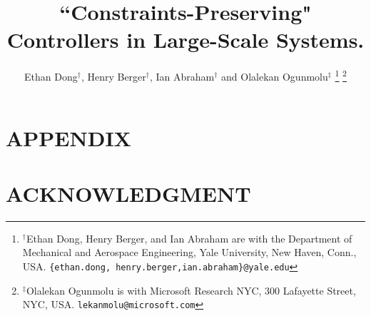 \documentclass[letterpaper, 10 pt, conference]{ieeeconf}  %
\title{\LARGE \bf
``Constraints-Preserving" Controllers in Large-Scale Systems.}
\author{Ethan Dong$^{\dagger}$, Henry Berger$^{\dagger}$,  Ian Abraham$^{\dagger}$ and Olalekan Ogunmolu$^{\ddagger}$
\thanks{$^{\dagger}$Ethan Dong, Henry Berger, and Ian Abraham are with the Department of Mechanical and Aerospace Engineering, Yale University, New Haven, Conn., USA.
{\tt\small \{ethan.dong, henry.berger,ian.abraham\}@yale.edu}}%
\thanks{$^{\ddagger}$Olalekan Ogunmolu  is with Microsoft Research NYC, 300 Lafayette Street, NYC, USA. {\tt\small lekanmolu@microsoft.com}}%
}
\numberwithin{equation}{section}
\begin{document}
\maketitle
\thispagestyle{empty}
\pagestyle{empty}









\addtolength{\textheight}{-12cm}   %







\section*{APPENDIX}

\section*{ACKNOWLEDGMENT}



	
\end{document}
